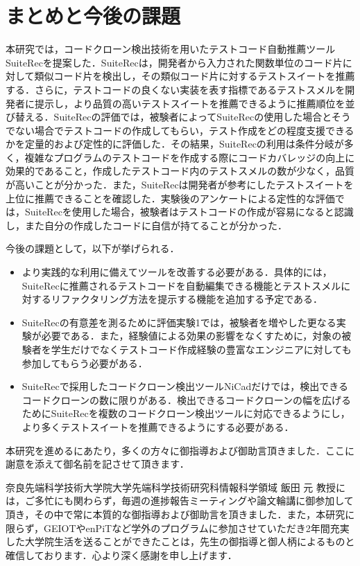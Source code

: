 \documentclass[12pt]{jarticle} %
\begin{document}
\section{まとめと今後の課題}
本研究では，コードクローン検出技術を用いたテストコード自動推薦ツール{\sf SuiteRec}を提案した．{\sf SuiteRec}は，開発者から入力された関数単位のコード片に対して類似コード片を検出し，その類似コード片に対するテストスイートを推薦する．さらに，テストコードの良くない実装を表す指標であるテストスメルを開発者に提示し，より品質の高いテストスイートを推薦できるように推薦順位を並び替える．{\sf SuiteRec}の評価では，被験者によって{\sf SuiteRec}の使用した場合とそうでない場合でテストコードの作成してもらい，テスト作成をどの程度支援できるかを定量的および定性的に評価した．その結果，{\sf SuiteRec}の利用は条件分岐が多く，複雑なプログラムのテストコードを作成する際にコードカバレッジの向上に効果的であること，作成したテストコード内のテストスメルの数が少なく，品質が高いことが分かった．また，{\sf SuiteRec}は開発者が参考にしたテストスイートを上位に推薦できることを確認した．実験後のアンケートによる定性的な評価では，{\sf SuiteRec}を使用した場合，被験者はテストコードの作成が容易になると認識し，また自分の作成したコードに自信が持てることが分かった．

今後の課題として，以下が挙げられる．

\begin{itemize}
\item より実践的な利用に備えてツールを改善する必要がある．具体的には，{\sf SuiteRec}に推薦されるテストコードを自動編集できる機能とテストスメルに対するリファクタリング方法を提示する機能を追加する予定である．
\item {\sf SuiteRec}の有意差を測るために評価実験1では，被験者を増やした更なる実験が必要である．また，経験値による効果の影響をなくすために，対象の被験者を学生だけでなくテストコード作成経験の豊富なエンジニアに対しても参加してもらう必要がある．
\item {\sf SuiteRec}で採用したコードクローン検出ツール{\sf NiCad}だけでは，検出できるコードクローンの数に限りがある．検出できるコードクローンの幅を広げるために{\sf SuiteRec}を複数のコードクローン検出ツールに対応できるようにし，より多くテストスイートを推薦できるようにする必要がある．
\end{itemize}


%
%
\acknowledgements

本研究を進めるにあたり，多くの方々に御指導および御助言頂きました．ここに謝意を添えて御名前を記させて頂きます．

奈良先端科学技術大学院大学先端科学技術研究科情報科学領域 飯田 元 教授には，ご多忙にも関わらず，毎週の進捗報告ミーティングや論文輪講に御参加して頂き，その中で常に本質的な御指導および御助言を頂きました．また，本研究に限らず，GEIOTやenPiTなど学外のプログラムに参加させていただき2年間充実した大学院生活を送ることができたことは，先生の御指導と御人柄によるものと確信しております．心より深く感謝を申し上げます．
\end{document}
